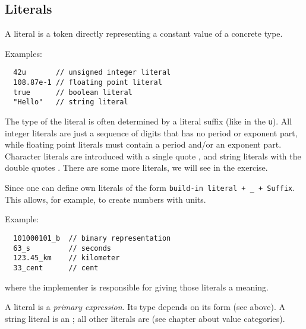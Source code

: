 \subsection{Literals\label{sec:literal}}
A literal is a token directly representing a constant value of a concrete type.

Examples:
\begin{verbatim}
  42u       // unsigned integer literal
  108.87e-1 // floating point literal
  true      // boolean literal
  "Hello"   // string literal
\end{verbatim}

The type of the literal is often determined by a literal suffix (like in  the \texttt{u}). All integer literals are just a
sequence of digits that has no period or exponent part, while floating point literals must contain a period and/or an exponent part.
Character literals are introduced with a single quote , and string literals with the double quotes . There are
some more literals, we will see in the exercise.

\begin{rem}
  Since\marginpar{[\cxx11]}  one can define own literals of the form \texttt{build-in literal + \_ + Suffix}. This allows, for example, to create
  numbers with units.

Example:
\begin{verbatim}
  101000101_b  // binary representation
  63_s         // seconds
  123.45_km    // kilometer
  33_cent      // cent
\end{verbatim}

where the implementer is responsible for giving those literals a meaning.
\end{rem}

\begin{rem}
  A literal is a \textit{primary expression}. Its type depends on its form (see above). A string literal is an ; all other
  literals are  (see chapter about value categories).
\end{rem}


